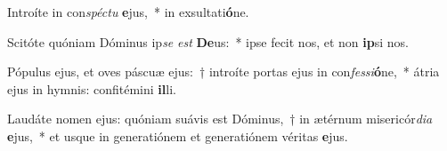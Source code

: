 \item Introíte in con\textit{spéc}\textit{tu} \textbf{e}jus,~* in exsultati\textbf{ó}ne.
\item Scitóte quóniam Dóminus ip\textit{se} \textit{est} \textbf{De}us:~* ipse fecit nos, et non \textbf{ip}si nos.
\item Pópulus ejus, et oves páscuæ ejus:~† introíte portas ejus in con\textit{fes}\textit{si}\textbf{ó}ne,~* átria ejus in hymnis: confitémini \textbf{il}li.
\item Laudáte nomen ejus: quóniam suávis est Dóminus,~† in ætérnum misericór\textit{di}\textit{a} \textbf{e}jus,~* et usque in generatiónem et generatiónem véritas \textbf{e}jus.
